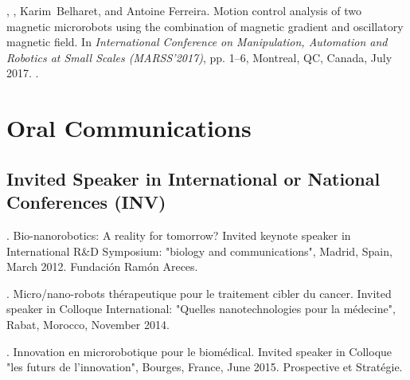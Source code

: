 \begin{Mybibliography}{10}
  \LMellal, \DavidFolio, Karim~Belharet, and Antoine Ferreira.
  \newblock Motion control analysis of two magnetic microrobots using the
  combination of magnetic gradient and oscillatory magnetic field.
  \newblock In \emph{International Conference on Manipulation, Automation and
    Robotics at Small Scales (MARSS'2017)}, pp. 1--6, Montreal, QC, Canada,
  July 2017.
  \newblock {}.
  
\end{Mybibliography}

\SkipAndBreak[4]

\section{Oral Communications}

  
\subsection[Invited Speaker]{Invited Speaker in International or National Conferences (INV)}
\begin{Mybibliography}{10}
  \DavidFolio.
  \newblock Bio-nanorobotics: A reality for tomorrow?
  \newblock Invited keynote speaker in International R\&D Symposium: "biology and
  communications", Madrid, Spain, March 2012.
  \newblock Fundación Ramón Areces.
  
  
  \DavidFolio.
  \newblock Micro/nano-robots thérapeutique pour le traitement cibler du cancer.
  \newblock Invited speaker in Colloque International: "Quelles nanotechnologies
  pour la m\'edecine", Rabat, Morocco, November 2014.
  
  \DavidFolio.
  \newblock Innovation en microrobotique pour le biomédical.
  \newblock Invited speaker in Colloque "les futurs de l'innovation", Bourges, France, June 2015.
  \newblock Prospective et Stratégie.
\end{Mybibliography}
  
